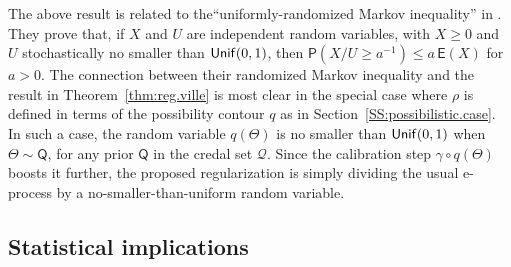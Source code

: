 \documentclass[a4paper, 12pt]{article}
\theoremstyle{plain}
\theoremstyle{definition}
\theoremstyle{remark}
\newcommand{\prob}{\mathsf{P}}
\newcommand{\E}{\mathsf{E}}
\newcommand{\unif}{{\sf Unif}}
\newcommand{\prior}{\mathsf{Q}}
\newcommand{\credal}{\mathscr{Q}}
\newcommand{\uuprob}{\mathbf{\overline{P}}}
\begin{document}
The above result is related to the``uniformly-randomized Markov inequality'' in \citet[][Theorem~1.2]{ramdas.randomized.markov}.  They prove that, if $X$ and $U$ are independent random variables, with $X \geq 0$ and $U$ stochastically no smaller than $\unif(0,1)$, then $\prob(X / U \geq a^{-1}) \leq a \,\E(X)$ for $a > 0$. 
The connection between their randomized Markov inequality and the result in Theorem~\ref{thm:reg.ville} is most clear in the special case where $\rho$ is defined in terms of the possibility contour $q$ as in Section~\ref{SS:possibilistic.case}.  In such a case, the random variable $q(\Theta)$ is no smaller than $\unif(0,1)$ when $\Theta \sim \prior$, for any prior $\prior$ in the credal set $\credal$.  Since the calibration step $\gamma \circ q(\Theta)$ boosts it further, the proposed regularization is simply dividing the usual e-process by a no-smaller-than-uniform random variable.  


\subsection{Statistical implications}
\label{SS:implications}
\end{document}
